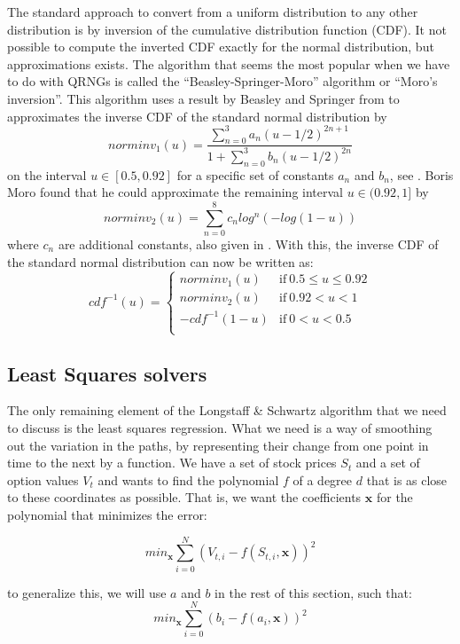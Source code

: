 The standard approach to convert from a uniform distribution to any
other distribution is by inversion of the cumulative distribution
function (CDF). It not possible to compute the inverted CDF exactly
for the normal distribution, but approximations exists. The algorithm
that seems the most popular when we have to do with QRNGs is called
the ``Beasley-Springer-Moro'' algorithm or ``Moro's inversion''. This
algorithm uses a result by Beasley and Springer from
\cite{beasley1977algorithm} to approximates the inverse CDF of the
standard normal distribution by
$$norminv_1(u) = \frac{\sum^3_{n=0}a_n(u-1/2)^{2n+1}}{1+\sum^3_{n=0}b_n(u-1/2)^{2n}}$$
on the interval $u \in [0.5, 0.92]$ for a specific set of constants
$a_n$ and $b_n$, see \cite[page 67-68]{glasserman2003monte}. Boris
Moro found \cite{moro1995full} that he could approximate the remaining
interval $u \in (0.92, 1]$ by $$norminv_2(u)= \sum^8_{n=0}c_n
log^n(-log(1-u))$$ where $c_n$ are additional constants, also given in
\cite{glasserman2003monte}. With this, the inverse CDF of the standard
normal distribution can now be written as:
$$cdf^{-1}(u) = \left\{
\begin{array}{ll}
  norminv_1(u) & \mathrm{if}~ 0.5 \leq u \leq 0.92\\
  norminv_2(u) & \mathrm{if}~ 0.92 < u < 1\\
  - cdf^{-1}(1-u) & \mathrm{if}~0 < u < 0.5\\
\end{array}\right.$$

\subsection{Least Squares solvers}
The only remaining element of the Longstaff \& Schwartz algorithm that
we need to discuss is the least squares regression. What we need is a
way of smoothing out the variation in the paths, by representing their
change from one point in time to the next by a function. We have a set
of stock prices $S_t$ and a set of option values $V_t$ and wants to
find the polynomial $f$ of a degree $d$ that is as close to these
coordinates as possible. That is, we want the coefficients
$\mathbf{x}$ for the polynomial that minimizes the error:

$$min_\mathbf{x} \sum^{N}_{i=0}(V_{t,i}-f(S_{t,i},\mathbf{x}))^2$$

to generalize this, we will use $a$ and $b$ in the rest of this
section, such that:
$$min_\mathbf{x} \sum^{N}_{i=0}(b_i-f(a_i,\mathbf{x}))^2$$

